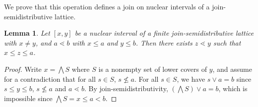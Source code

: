 \documentclass[leqno, 12pt]{amsart}
\numberwithin{equation}{section}
\renewcommand{\L}{\mathbf L}
\newcommand{\popup}{\operatorname{pop}^\uparrow}
\newcommand{\joinlabel}{\operatorname{j}}
\numberwithin{equation}{section}
\newtheorem{lem}[thm]{Lemma}
\newtheorem{prop}[thm]{Proposition}
\theoremstyle{remark}
\begin{document}
%

We prove that this operation defines a join on nuclear intervals of a join-semidistributive lattice.
\begin{lem}
  \label{lem:faces_lattice}
   Let $[x,y]$ be a nuclear interval of a finite join-semidistributive lattice with $x\neq y$, and $a\lessdot b$ with $x\le a$ and $y\le b$. Then there exists $z\lessdot y$ such that $x\le z\le a$.
\end{lem}
\begin{proof}
   Write $x =\bigwedge S$ where $S$ is a nonempty set of lower covers of $y$, and assume for a contradiction that for all $s\in S$, $s\nleq a$. For all $s\in S$, we have $s\vee a = b$ since $s\le y\le b$, $s\nleq a$ and $a\lessdot b$. By join-semidistributivity, $\left( \bigwedge S\right)\vee a=b$, which is impossible since $\bigwedge S = x\le a < b$.
\end{proof}
\end{document}
